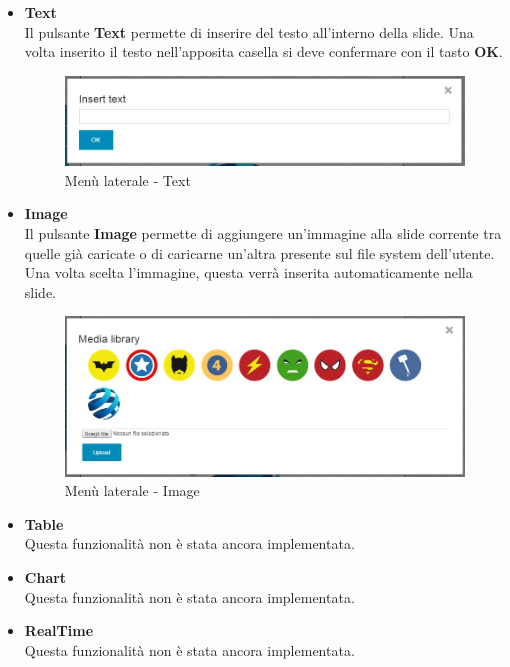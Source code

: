 \begin{itemize}
 \item \textbf{Text}\\
    Il pulsante \textbf{Text} permette di inserire del testo all'interno della slide. Una volta inserito il testo nell'apposita casella si deve confermare con il tasto \textbf{OK}.
    \begin{figure}[H] 
	\centering 
	\includegraphics[scale=0.40] {img/editor_text}
	\caption{Menù laterale - Text} 
    \end{figure}
    
    
 \item \textbf{Image}\\
    Il pulsante \textbf{Image} permette di aggiungere un'immagine alla slide corrente tra quelle già caricate o di caricarne un'altra presente sul file system dell'utente. Una volta scelta l'immagine, questa verrà inserita automaticamente nella slide.
   \begin{figure}[H] 
	\centering 
	\includegraphics[scale=0.40] {img/editor_img}
	\caption{Menù laterale - Image} 
    \end{figure}

  \item \textbf{Table}\\
  Questa funzionalità non è stata ancora implementata.
  
  \item \textbf{Chart}\\
  Questa funzionalità non è stata ancora implementata.
  
  \item \textbf{RealTime}\\
  Questa funzionalità non è stata ancora implementata.



\end{itemize}
